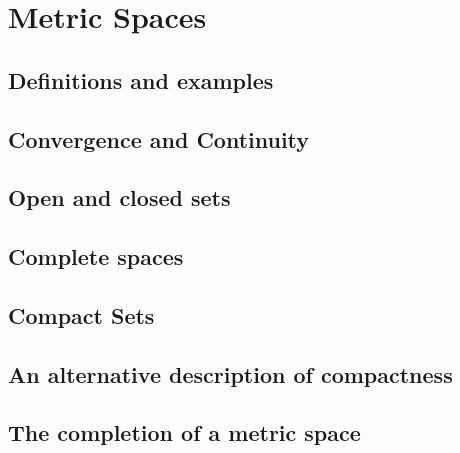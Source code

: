 \chapter{Metric Spaces}

\section{Definitions and examples}
\section{Convergence and Continuity}
\section{Open and closed sets}
\section{Complete spaces}
\section{Compact Sets}
\section{An alternative description of compactness}
\section{The completion of a metric space}

